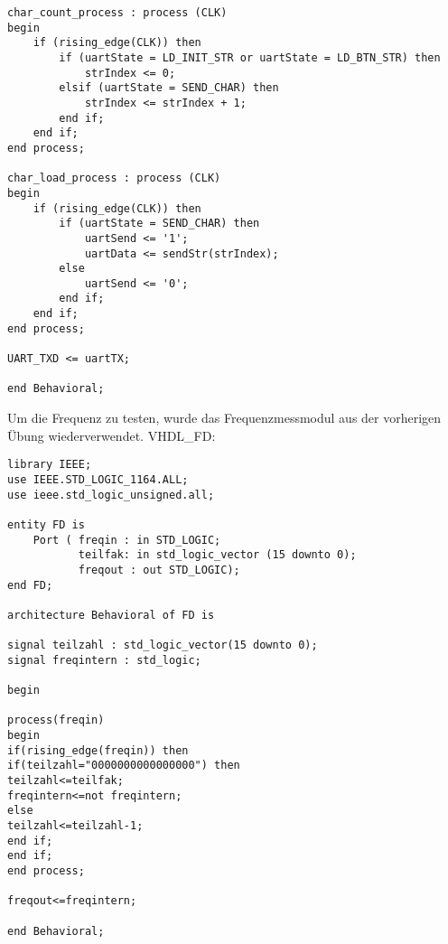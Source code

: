 \documentclass{article}
\begin{document}
\begin{verbatim}
char_count_process : process (CLK)
begin
	if (rising_edge(CLK)) then
		if (uartState = LD_INIT_STR or uartState = LD_BTN_STR) then
			strIndex <= 0;
		elsif (uartState = SEND_CHAR) then
			strIndex <= strIndex + 1;
		end if;
	end if;
end process;

char_load_process : process (CLK)
begin
	if (rising_edge(CLK)) then
		if (uartState = SEND_CHAR) then
			uartSend <= '1';
			uartData <= sendStr(strIndex);
		else
			uartSend <= '0';
		end if;
	end if;
end process;

UART_TXD <= uartTX;

end Behavioral;
\end{verbatim}
Um die Frequenz zu testen, wurde das Frequenzmessmodul aus der vorherigen \"Ubung wiederverwendet.\newline
VHDL\_FD:\newline
\begin{verbatim}
library IEEE;
use IEEE.STD_LOGIC_1164.ALL;
use ieee.std_logic_unsigned.all;

entity FD is
    Port ( freqin : in STD_LOGIC;
           teilfak: in std_logic_vector (15 downto 0);
           freqout : out STD_LOGIC);
end FD;

architecture Behavioral of FD is

signal teilzahl : std_logic_vector(15 downto 0);
signal freqintern : std_logic;

begin

process(freqin)
begin
if(rising_edge(freqin)) then
if(teilzahl="0000000000000000") then
teilzahl<=teilfak;
freqintern<=not freqintern;
else
teilzahl<=teilzahl-1;
end if;
end if;
end process;

freqout<=freqintern;

end Behavioral;
\end{verbatim}
\end{document}
